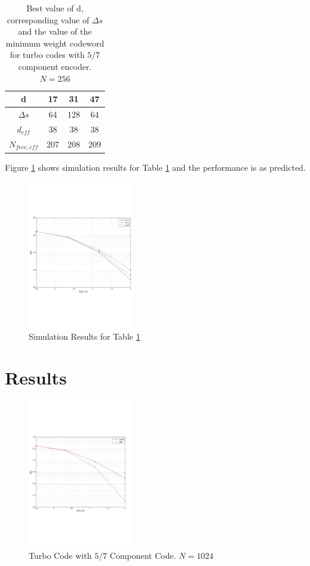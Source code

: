 \documentclass[twocolumn]{article}
\begin{document}
 \begin{table}[h!]
\centering
\begin{tabular}{||c |c |c |c||} 
 \hline
 d & 17 & 31 & 47 \\ [0.5ex] 
 \hline\hline
 $\Delta s$ & 64 & 128 & 64 \\ 
 \hline
  $d_{eff}$ & 38 & 38 & 38 \\ 
  \hline
  $N_{free, eff}$ & 207 & 208 & 209 \\ [1ex] 
 \hline
\end{tabular}
\caption{Best value of d,  corresponding value of $\Delta s$ 
and the value of the minimum weight codeword for
 turbo codes with $5/7$ component encoder. $N=256$}
\label{tab1}
\end{table}

 Figure \ref{comp1} shows simulation results for Table 
 \ref{tab1} and the performance is as predicted.
\begin{figure}[h!]
\centering
		\includegraphics[height = 6.5cm,trim={0 7.2cm 0 6cm},clip]{myInterleaver_(comparison_256)_5_7_2.pdf}
		\caption{Simulation Results for Table \ref{tab1}}
		\label{comp1}
		\end{figure}
		
\section{Results}
\begin{figure}[h!]
\centering
		\includegraphics[height = 6.5cm,trim={0 7.2cm 0 6cm},clip]{msi_linear_256_1000Frames_2.pdf}
		\caption{Turbo Code with $5/7$ Component Code. $N=1024$}
		\label{res1}
		\end{figure}
		
\end{document}
